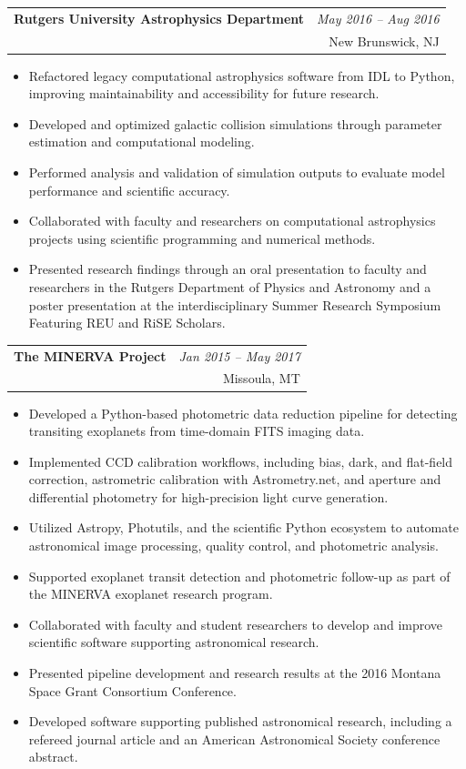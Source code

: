 \documentclass[a4paper,11pt]{article}
\makeatletter
\newcommand{\resumeExp}[4]{
\vspace{2mm}\item[]
    \begin{tabular*}{\textwidth}[t]{l@{\extracolsep{\fill}}r}
        \hspace{-4.4mm} \textbf{#1} \vspace{0mm} & {\footnotesize\emph{#3}}\vspace{0mm}\\
        \hspace{-4.3mm} \footnotesize{\text{#2}} \vspace{2mm} &\footnotesize{#4}
    \end{tabular*}
    \vspace{-6.1mm}
}
\newcommand{\resumeItemListStart}{\begin{justify}\begin{itemize}[leftmargin=3ex, rightmargin=2ex, noitemsep,labelsep=1.2mm,itemsep=0mm]\small}
\newcommand{\resumeItemListEnd}{\end{itemize}\end{justify}\vspace{-1.5mm}}
\makeatother
\begin{document}
\resumeExp
{Rutgers University Astrophysics Department}
{Research Assistant}
{May 2016 -- Aug 2016}
{New Brunswick, NJ}
\resumeItemListStart
\item[$\bullet$] Refactored legacy computational astrophysics software from IDL to Python, improving maintainability and accessibility for future research.
\item[$\bullet$] Developed and optimized galactic collision simulations through parameter estimation and computational modeling.
\item[$\bullet$] Performed analysis and validation of simulation outputs to evaluate model performance and scientific accuracy.
\item[$\bullet$] Collaborated with faculty and researchers on computational astrophysics projects using scientific programming and numerical methods.
\item[$\bullet$] Presented research findings through an oral presentation to faculty and researchers in the Rutgers Department of Physics and Astronomy and a poster presentation at the interdisciplinary Summer Research Symposium Featuring REU and RiSE Scholars.
\resumeItemListEnd

\resumeExp
{The MINERVA Project}
{Research Assistant}
{Jan 2015 -- May 2017}
{Missoula, MT}
\resumeItemListStart
\item[$\bullet$] Developed a Python-based photometric data reduction pipeline for detecting transiting exoplanets from time-domain FITS imaging data.
\item[$\bullet$] Implemented CCD calibration workflows, including bias, dark, and flat-field correction, astrometric calibration with Astrometry.net, and aperture and differential photometry for high-precision light curve generation.
\item[$\bullet$] Utilized Astropy, Photutils, and the scientific Python ecosystem to automate astronomical image processing, quality control, and photometric analysis.
\item[$\bullet$] Supported exoplanet transit detection and photometric follow-up as part of the MINERVA exoplanet research program.
\item[$\bullet$] Collaborated with faculty and student researchers to develop and improve scientific software supporting astronomical research.
\item[$\bullet$] Presented pipeline development and research results at the 2016 Montana Space Grant Consortium Conference.
\item[$\bullet$] Developed software supporting published astronomical research, including a refereed journal article and an American Astronomical Society conference abstract.
\resumeItemListEnd
\end{document}
